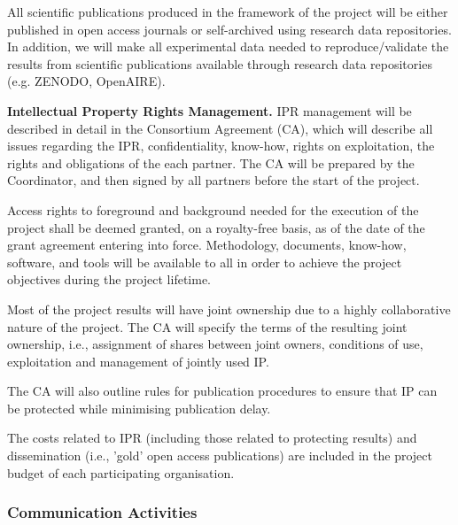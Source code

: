 All scientific publications produced in the framework of the project will be either published in open access journals or self-archived using research data repositories. In addition, we will make all experimental data needed to reproduce/validate the results from scientific publications available through research data repositories (e.g. ZENODO, OpenAIRE). 

{\bf Intellectual Property Rights Management.} IPR management will be described in detail in the Consortium Agreement (CA), which will describe all issues regarding the IPR, confidentiality, know-how, rights on exploitation, the rights and obligations of the each partner. The CA will be prepared by the Coordinator, and then signed by all partners before the start of the project. 

Access rights to foreground and background needed for the execution of the project shall be deemed granted, on a royalty-free basis, as of the date of the grant agreement entering into force. Methodology, documents, know-how, software, and tools will be available to all in order to achieve the project objectives during the project lifetime. 

Most of the project results will have joint ownership due to a highly collaborative nature of the project. The CA will specify the terms of the resulting joint ownership, i.e., assignment of shares between joint owners, conditions of use, exploitation and management of jointly used IP. 

The CA will also outline rules for publication procedures to ensure that IP can be protected while minimising publication delay.

The costs related to IPR (including those related to protecting results) and dissemination (i.e., 'gold' open access publications) are included in the project budget of each participating organisation. 

\subsubsection{Communication Activities}
\label{subsubsect:communication}


